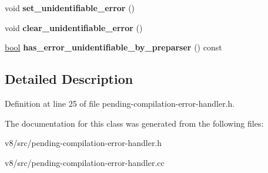 \begin{DoxyCompactItemize}
\item 
\mbox{\label{classv8_1_1internal_1_1PendingCompilationErrorHandler_a0d3e47c7fd10184238c6171a9ef807fd}} 
void {\bfseries set\+\_\+unidentifiable\+\_\+error} ()
\item 
\mbox{\label{classv8_1_1internal_1_1PendingCompilationErrorHandler_adc7fa9006b4bf4a970460907705f6141}} 
void {\bfseries clear\+\_\+unidentifiable\+\_\+error} ()
\item 
\mbox{\label{classv8_1_1internal_1_1PendingCompilationErrorHandler_afee2bee02441f86d28c590e099c19978}} 
\mbox{\hyperlink{classbool}{bool}} {\bfseries has\+\_\+error\+\_\+unidentifiable\+\_\+by\+\_\+preparser} () const
\end{DoxyCompactItemize}


\subsection{Detailed Description}


Definition at line 25 of file pending-\/compilation-\/error-\/handler.\+h.



The documentation for this class was generated from the following files\+:\begin{DoxyCompactItemize}
\item 
v8/src/pending-\/compilation-\/error-\/handler.\+h\item 
v8/src/pending-\/compilation-\/error-\/handler.\+cc\end{DoxyCompactItemize}
